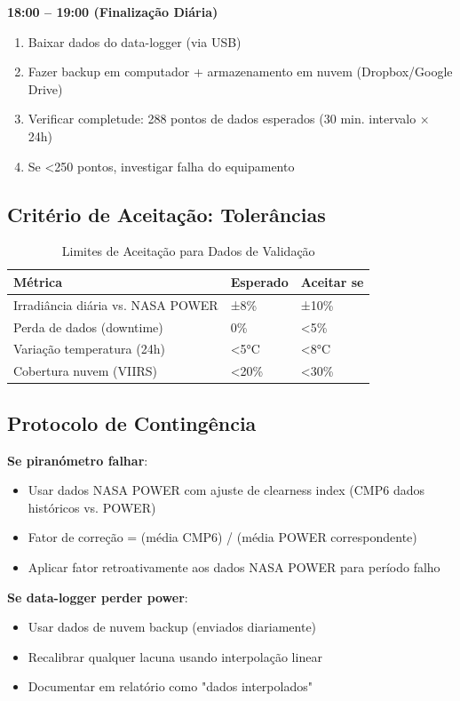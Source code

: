 \documentclass[12pt, a4paper]{article}
\begin{document}
\begin{itemize}
\textbf{18:00 – 19:00 (Finalização Diária)}
\begin{enumerate}
\item Baixar dados do data-logger (via USB)
\item Fazer backup em computador + armazenamento em nuvem (Dropbox/Google Drive)
\item Verificar completude: 288 pontos de dados esperados (30 min. intervalo × 24h)
\item Se <250 pontos, investigar falha do equipamento
\end{enumerate}

\subsection{Critério de Aceitação: Tolerâncias}

\begin{table}[H]
\centering
\caption{Limites de Aceitação para Dados de Validação}
\label{tab:acceptance_criteria}
\small
\begin{tabular}{|l|l|l|}
\hline
\textbf{Métrica} & \textbf{Esperado} & \textbf{Aceitar se} \\
\hline
Irradiância diária vs. NASA POWER & ±8\% & ±10\% \\
Perda de dados (downtime) & 0\% & <5\% \\
Variação temperatura (24h) & <5°C & <8°C \\
Cobertura nuvem (VIIRS) & <20\% & <30\% \\
\hline
\end{tabular}
\end{table}

\subsection{Protocolo de Contingência}

\textbf{Se piranómetro falhar}:
\begin{itemize}
\item Usar dados NASA POWER com ajuste de clearness index (CMP6 dados históricos vs. POWER)
\item Fator de correção = (média CMP6) / (média POWER correspondente)
\item Aplicar fator retroativamente aos dados NASA POWER para período falho
\end{itemize}

\textbf{Se data-logger perder power}:
\begin{itemize}
\item Usar dados de nuvem backup (enviados diariamente)
\item Recalibrar qualquer lacuna usando interpolação linear
\item Documentar em relatório como "dados interpolados"
\end{itemize}


\end{itemize}
\end{document}
